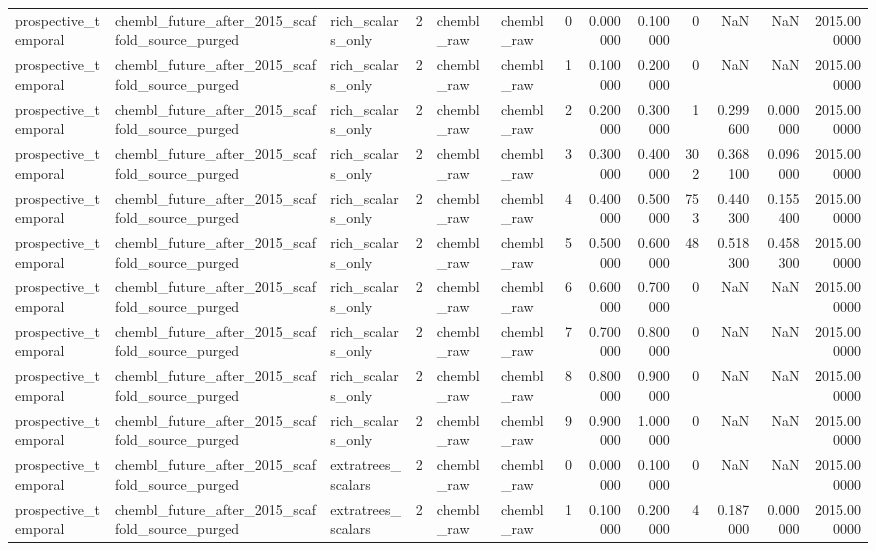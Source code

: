 \begin{longtable}{lllrllrrrrrrr}
prospective\_temporal & chembl\_future\_after\_2015\_scaffold\_source\_purged & rich\_scalars\_only & 2 & chembl\_raw & chembl\_raw & 0 & 0.000000 & 0.100000 & 0 & NaN & NaN & 2015.000000 \\
prospective\_temporal & chembl\_future\_after\_2015\_scaffold\_source\_purged & rich\_scalars\_only & 2 & chembl\_raw & chembl\_raw & 1 & 0.100000 & 0.200000 & 0 & NaN & NaN & 2015.000000 \\
prospective\_temporal & chembl\_future\_after\_2015\_scaffold\_source\_purged & rich\_scalars\_only & 2 & chembl\_raw & chembl\_raw & 2 & 0.200000 & 0.300000 & 1 & 0.299600 & 0.000000 & 2015.000000 \\
prospective\_temporal & chembl\_future\_after\_2015\_scaffold\_source\_purged & rich\_scalars\_only & 2 & chembl\_raw & chembl\_raw & 3 & 0.300000 & 0.400000 & 302 & 0.368100 & 0.096000 & 2015.000000 \\
prospective\_temporal & chembl\_future\_after\_2015\_scaffold\_source\_purged & rich\_scalars\_only & 2 & chembl\_raw & chembl\_raw & 4 & 0.400000 & 0.500000 & 753 & 0.440300 & 0.155400 & 2015.000000 \\
prospective\_temporal & chembl\_future\_after\_2015\_scaffold\_source\_purged & rich\_scalars\_only & 2 & chembl\_raw & chembl\_raw & 5 & 0.500000 & 0.600000 & 48 & 0.518300 & 0.458300 & 2015.000000 \\
prospective\_temporal & chembl\_future\_after\_2015\_scaffold\_source\_purged & rich\_scalars\_only & 2 & chembl\_raw & chembl\_raw & 6 & 0.600000 & 0.700000 & 0 & NaN & NaN & 2015.000000 \\
prospective\_temporal & chembl\_future\_after\_2015\_scaffold\_source\_purged & rich\_scalars\_only & 2 & chembl\_raw & chembl\_raw & 7 & 0.700000 & 0.800000 & 0 & NaN & NaN & 2015.000000 \\
prospective\_temporal & chembl\_future\_after\_2015\_scaffold\_source\_purged & rich\_scalars\_only & 2 & chembl\_raw & chembl\_raw & 8 & 0.800000 & 0.900000 & 0 & NaN & NaN & 2015.000000 \\
prospective\_temporal & chembl\_future\_after\_2015\_scaffold\_source\_purged & rich\_scalars\_only & 2 & chembl\_raw & chembl\_raw & 9 & 0.900000 & 1.000000 & 0 & NaN & NaN & 2015.000000 \\
prospective\_temporal & chembl\_future\_after\_2015\_scaffold\_source\_purged & extratrees\_scalars & 2 & chembl\_raw & chembl\_raw & 0 & 0.000000 & 0.100000 & 0 & NaN & NaN & 2015.000000 \\
prospective\_temporal & chembl\_future\_after\_2015\_scaffold\_source\_purged & extratrees\_scalars & 2 & chembl\_raw & chembl\_raw & 1 & 0.100000 & 0.200000 & 4 & 0.187000 & 0.000000 & 2015.000000 \\

\end{longtable}
